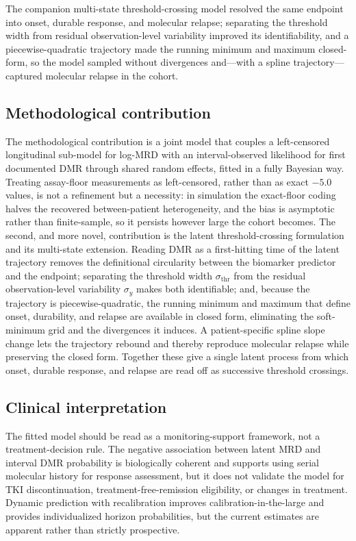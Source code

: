 \documentclass[11pt]{article}
\begin{document}
The companion multi-state threshold-crossing model resolved the same endpoint into
onset, durable response, and molecular relapse; separating the threshold width
from residual observation-level variability improved its identifiability, and a piecewise-quadratic
trajectory made the running minimum and maximum closed-form, so the model
sampled without divergences and---with a spline trajectory---captured molecular
relapse in the cohort.

\subsection{Methodological contribution}

The methodological contribution is a joint model that couples a
left-censored longitudinal sub-model for log-MRD with an interval-observed
likelihood for first documented DMR through shared random effects, fitted in
a fully Bayesian way. Treating assay-floor measurements as left-censored,
rather than as exact $-5.0$ values, is not a refinement but a necessity: in
simulation the exact-floor coding halves the recovered between-patient
heterogeneity, and the bias is asymptotic rather than finite-sample, so it
persists however large the cohort becomes. The second, and more novel, contribution is the latent threshold-crossing
formulation and its multi-state extension. Reading DMR as a first-hitting time
of the latent trajectory removes the definitional circularity between the
biomarker predictor and the endpoint; separating the threshold width
$\sigma_{\mathrm{thr}}$ from the residual observation-level variability $\sigma_y$ makes both
identifiable; and, because the trajectory is piecewise-quadratic, the running
minimum and maximum that define onset, durability, and relapse are available in
closed form, eliminating the soft-minimum grid and the divergences it induces.
A patient-specific spline slope change lets the trajectory rebound and thereby
reproduce molecular relapse while preserving the closed form. Together these
give a single latent process from which onset, durable response, and relapse
are read off as successive threshold crossings.

\subsection{Clinical interpretation}

The fitted model should be read as a monitoring-support framework, not a
treatment-decision rule. The negative association between latent MRD and
interval DMR probability is biologically coherent and supports using
serial molecular history for response assessment, but it does not validate
the model for TKI discontinuation, treatment-free-remission eligibility,
or changes in treatment. Dynamic prediction with recalibration improves
calibration-in-the-large and provides individualized horizon
probabilities, but the current estimates are apparent rather than strictly
prospective.
\end{document}
